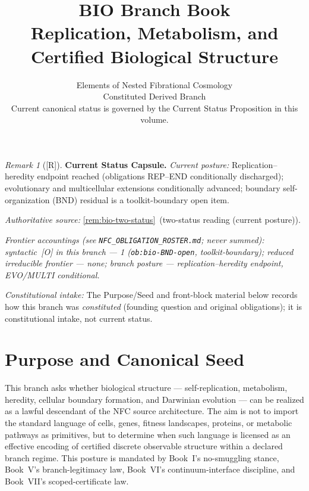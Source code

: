 \documentclass[12pt,oneside]{amsbook}
\theoremstyle{plain}
\theoremstyle{definition}
\theoremstyle{remark}
\newtheorem{remark}[theorem]{Remark}
\newcommand{\status}[1]{\textup{[#1]}}
\begin{document}
\title{BIO Branch Book\\[6pt]
 Replication, Metabolism, and Certified Biological Structure}
\author{Elements of Nested Fibrational Cosmology\\
 Constituted Derived Branch\\
 {\normalsize Current canonical status is governed by the Current Status Proposition in this volume.}}
\date{}
\maketitle
\tableofcontents
\newpage


\begin{remark}[\status{R}]\label{cap:BIO-status}
\textbf{Current Status Capsule.}
\emph{Current posture:} Replication--heredity endpoint reached (obligations REP--END conditionally discharged); evolutionary and multicellular extensions conditionally advanced; boundary self-organization (BND) residual is a toolkit-boundary open item.

\emph{Authoritative source:} \ref{rem:bio-two-status}~(two-status reading (current posture)).

\emph{Frontier accountings (see \texttt{NFC\_OBLIGATION\_ROSTER.md}; never summed): syntactic~[O] in this branch --- 1 (\texttt{ob:bio-BND-open}, toolkit-boundary); reduced irreducible frontier --- none; branch posture --- replication--heredity endpoint, EVO/MULTI conditional.}

\emph{Constitutional intake:} The Purpose/Seed and front-block material below records how this branch was \emph{constituted} (founding question and original obligations); it is constitutional intake, not current status.
\end{remark}

\section{Purpose and Canonical Seed}\label{sec:bio-purpose}

This branch asks whether biological structure --- self-replication,
metabolism, heredity, cellular boundary formation, and Darwinian
evolution --- can be realized as a lawful descendant of the NFC source
architecture. The aim is not to import the standard language of
cells, genes, fitness landscapes, proteins, or metabolic pathways as
primitives, but to determine when such language is licensed
as an effective encoding of certified discrete observable structure
within a declared branch regime. This posture is mandated by
Book~I's no-smuggling stance, Book~V's branch-legitimacy law,
Book~VI's continuum-interface discipline, and Book~VII's
scoped-certificate law.
\end{document}
